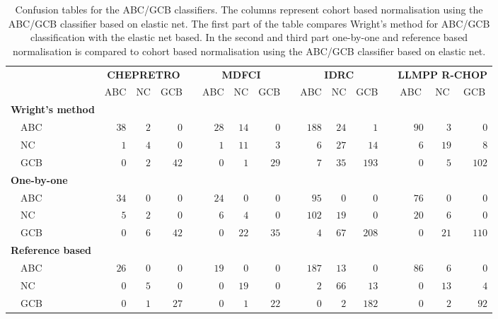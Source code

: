 \begin{table}[!tbp]
{\footnotesize
\caption{Confusion tables for the ABC/GCB classifiers.
The columns represent cohort based normalisation using the ABC/GCB classifier
based on elastic net.
The first part of the table compares Wright's method for ABC/GCB classification
with the elastic net based.
In the second and third part one-by-one and reference based normalisation is
compared to cohort based normalisation using the ABC/GCB classifier based on
elastic net.\label{tab:confusionABCGCBHEMA}} 
\begin{center}
\begin{tabular}{lrrrcrrrcrrrcrrr}
\hline\hline
\multicolumn{1}{l}{\bfseries }&\multicolumn{3}{c}{\bfseries CHEPRETRO}&\multicolumn{1}{c}{\bfseries }&\multicolumn{3}{c}{\bfseries MDFCI}&\multicolumn{1}{c}{\bfseries }&\multicolumn{3}{c}{\bfseries IDRC}&\multicolumn{1}{c}{\bfseries }&\multicolumn{3}{c}{\bfseries LLMPP R-CHOP}\tabularnewline
\cline{2-4} \cline{6-8} \cline{10-12} \cline{14-16}
\multicolumn{1}{l}{}&\multicolumn{1}{c}{ABC}&\multicolumn{1}{c}{NC}&\multicolumn{1}{c}{GCB}&\multicolumn{1}{c}{}&\multicolumn{1}{c}{ABC}&\multicolumn{1}{c}{NC}&\multicolumn{1}{c}{GCB}&\multicolumn{1}{c}{}&\multicolumn{1}{c}{ABC}&\multicolumn{1}{c}{NC}&\multicolumn{1}{c}{GCB}&\multicolumn{1}{c}{}&\multicolumn{1}{c}{ABC}&\multicolumn{1}{c}{NC}&\multicolumn{1}{c}{GCB}\tabularnewline
\hline
{\bfseries Wright's method}&&&&&&&&&&&&&&&\tabularnewline
~~ABC&$38$&$2$&$ 0$&&$28$&$14$&$ 0$&&$188$&$24$&$  1$&&$90$&$ 3$&$  0$\tabularnewline
~~NC&$ 1$&$4$&$ 0$&&$ 1$&$11$&$ 3$&&$  6$&$27$&$ 14$&&$ 6$&$19$&$  8$\tabularnewline
~~GCB&$ 0$&$2$&$42$&&$ 0$&$ 1$&$29$&&$  7$&$35$&$193$&&$ 0$&$ 5$&$102$\tabularnewline
\hline
{\bfseries One-by-one}&&&&&&&&&&&&&&&\tabularnewline
~~ABC&$34$&$0$&$ 0$&&$24$&$ 0$&$ 0$&&$ 95$&$ 0$&$  0$&&$76$&$ 0$&$  0$\tabularnewline
~~NC&$ 5$&$2$&$ 0$&&$ 6$&$ 4$&$ 0$&&$102$&$19$&$  0$&&$20$&$ 6$&$  0$\tabularnewline
~~GCB&$ 0$&$6$&$42$&&$ 0$&$22$&$35$&&$  4$&$67$&$208$&&$ 0$&$21$&$110$\tabularnewline
\hline
{\bfseries Reference based}&&&&&&&&&&&&&&&\tabularnewline
~~ABC&$26$&$0$&$ 0$&&$19$&$ 0$&$ 0$&&$187$&$13$&$  0$&&$86$&$ 6$&$  0$\tabularnewline
~~NC&$ 0$&$5$&$ 0$&&$ 0$&$19$&$ 0$&&$  2$&$66$&$ 13$&&$ 0$&$13$&$  4$\tabularnewline
~~GCB&$ 0$&$1$&$27$&&$ 0$&$ 1$&$22$&&$  0$&$ 2$&$182$&&$ 0$&$ 2$&$ 92$\tabularnewline
\hline
\end{tabular}\end{center}}

\end{table}

